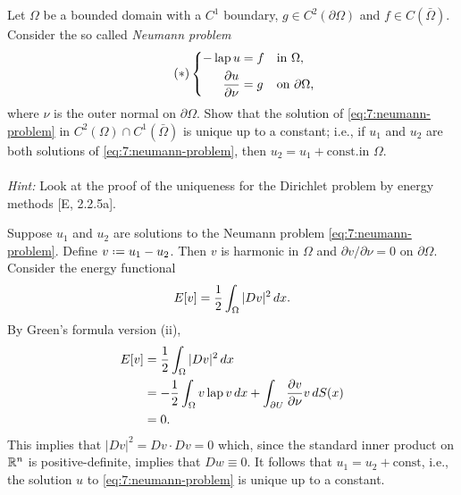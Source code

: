 \begin{problem}
  Let \(\Omega\) be a bounded domain with a \(C^1\) boundary, \(g\in
  C^2(\partial\Omega)\) and \(f\in C(\bar\Omega)\). Consider the so called
  \emph{Neumann problem}
  \[
    \label{eq:7:neumann-problem}%
    \tag{\(*\)}%
    \left\{
      \begin{aligned}
        -\Lap u&=f&&\text{in \(\Omega\),}\\
        \frac{\partial u}{\partial\nu}&=g&&\text{on \(\partial\Omega\),}
      \end{aligned}
    \right.
  \]
  where \(\nu\) is the outer normal on \(\partial\Omega\). Show that the
  solution of \eqref{eq:7:neumann-problem} in
  \(C^2(\Omega)\cap C^1(\bar\Omega)\) is unique up to a constant; i.e., if
  \(u_1\) and \(u_2\) are both solutions of \eqref{eq:7:neumann-problem},
  then \(u_2=u_1+\text{const.}\)\@ in \(\Omega\).
  \\\\
  \emph{Hint:} Look at the proof of the uniqueness for the Dirichlet
  problem by energy methods [E, 2.2.5a].
\end{problem}
\begin{solution*}
  Suppose \(u_1\) and \(u_2\) are solutions to the Neumann problem
  \eqref{eq:7:neumann-problem}. Define \(v\defeq u_1-u_2\). Then \(v\) is
  harmonic in \(\Omega\) and \(\partial v/\partial \nu=0\) on
  \(\partial\Omega\). Consider the energy functional
  \[
    E[v]=\frac{1}{2}\int_\Omega|Dv|^2\mathop{}\!d x.
  \]
  By Green's formula version (ii),
  \begin{align*}
    E[v]
    &=\frac{1}{2}\int_\Omega|Dv|^2\mathop{}\!d x\\
    &=-\frac{1}{2}\int_\Omega v\operatorname{lap} v\mathop{}\!d x
      +\int_{\partial U}\frac{\partial
      v}{\partial\nu} v\mathop{}\!d S(x)\\
    &=0.
  \end{align*}
  This implies that \(|Dv|^2=Dv\cdot Dv=0\) which, since the standard inner
  product on \(\mathbb{R}^n\) is positive-definite, implies that \(Dw\equiv
  0\). It follows that \(u_1=u_2+\text{const}\), i.e., the solution \(u\)
  to \eqref{eq:7:neumann-problem} is unique up to a constant.
\end{solution*}

